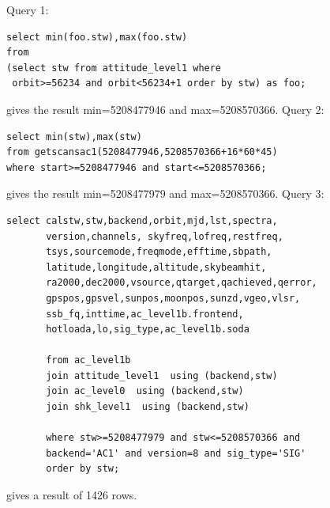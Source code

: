 \documentclass[12pt]{article}
\begin{document}
Query 1:
\begin{verbatim}
select min(foo.stw),max(foo.stw) 
from
(select stw from attitude_level1 where
 orbit>=56234 and orbit<56234+1 order by stw) as foo;
\end{verbatim}
gives the result min=5208477946 and max=5208570366.\newline
Query 2:
\begin{verbatim}
select min(stw),max(stw) 
from getscansac1(5208477946,5208570366+16*60*45) 
where start>=5208477946 and start<=5208570366;
\end{verbatim}
gives the result min=5208477979 and max=5208570366.\newline
Query 3:
\begin{verbatim} 
select calstw,stw,backend,orbit,mjd,lst,spectra,
       version,channels, skyfreq,lofreq,restfreq,
       tsys,sourcemode,freqmode,efftime,sbpath,
       latitude,longitude,altitude,skybeamhit,  
       ra2000,dec2000,vsource,qtarget,qachieved,qerror,
       gpspos,gpsvel,sunpos,moonpos,sunzd,vgeo,vlsr,
       ssb_fq,inttime,ac_level1b.frontend,
       hotloada,lo,sig_type,ac_level1b.soda

       from ac_level1b
       join attitude_level1  using (backend,stw)
       join ac_level0  using (backend,stw)
       join shk_level1  using (backend,stw)
       
       where stw>=5208477979 and stw<=5208570366 and 
       backend='AC1' and version=8 and sig_type='SIG'
       order by stw;

\end{verbatim}
gives a result of 1426 rows. 
\end{document}
